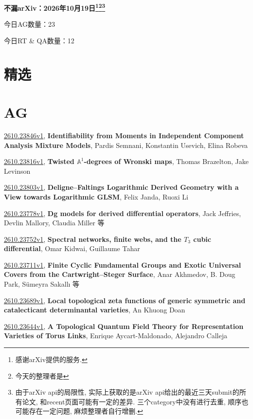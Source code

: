 \documentclass[9pt, a4paper]{article}
\theoremstyle{plain}
\theoremstyle{definition}
\theoremstyle{remark}
\newcommand{\arxiv}[3]{\href{https://arxiv.org/abs/#1}{#1}, \textbf{\textcolor{arxivblue}{#2}}, #3}
\newcommand{\AGnumber}{23}
\newcommand{\RTQAnumber}{12}
\newcommand{\NewestDate}{2026年10月19日}
\newcommand{\todayarXiver}{} %
\begin{document}
\begin{center}
    \Huge\textbf{不漏arXiv：\NewestDate\footnote{感谢arXiv提供的服务.}\footnote{今天的整理者是\todayarXiver}\footnote{由于arXiv api的局限性, 实际上获取的是arXiv api给出的最近三天submit的所有论文, 和recent页面可能有一定的差异. 三个category中没有进行去重, 顺序也可能存在一定问题, 麻烦整理者自行增删.}} \\
\end{center}

\setcounter{section}{-1}

\begin{center}
    今日AG数量：\AGnumber
    
    今日RT \& QA数量：\RTQAnumber
    
\end{center}


\section{精选}


\section{AG}
\arxiv{2610.23846v1}{Identifiability from Moments in Independent Component Analysis Mixture Models}{Pardis Semnani, Konstantin Usevich, Elina Robeva}

\arxiv{2610.23816v1}{Twisted $\mathbb{A}^1$-degrees of Wronski maps}{Thomas Brazelton, Jake Levinson}

\arxiv{2610.23803v1}{Deligne--Faltings Logarithmic Derived Geometry with a View towards Logarithmic GLSM}{Felix Janda, Ruoxi Li}

\arxiv{2610.23778v1}{Dg models for derived differential operators}{Jack Jeffries, Devlin Mallory, Claudia Miller 等}

\arxiv{2610.23752v1}{Spectral networks, finite webs, and the $T_3$ cubic differential}{Omar Kidwai, Guillaume Tahar}

\arxiv{2610.23711v1}{Finite Cyclic Fundamental Groups and Exotic Universal Covers from the Cartwright--Steger Surface}{Anar Akhmedov, B. Doug Park, Sümeyra Sakallı 等}

\arxiv{2610.23689v1}{Local topological zeta functions of generic symmetric and catalecticant determinantal varieties}{An Khuong Doan}

\arxiv{2610.23644v1}{A Topological Quantum Field Theory for Representation Varieties of Torus Links}{Enrique Aycart-Maldonado, Alejandro Calleja}
\end{document}
